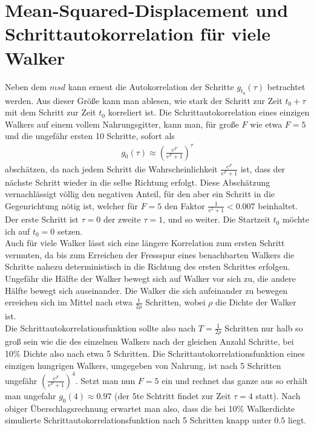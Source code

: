 \documentclass[a4paper, 12pt]{report}
\begin{document}
\section{Mean-Squared-Displacement und Schrittautokorrelation für viele Walker}
Neben dem $msd$ kann erneut die Autokorrelation der Schritte $g_{t_0}(\tau)$ betrachtet werden. Aus dieser Größe kann man ablesen, wie stark der Schritt zur Zeit $t_0 + \tau$ mit dem Schritt zur Zeit $t_0$ korreliert ist.
Die Schrittautokorrelation eines einzigen Walkers auf einem vollem Nahrungsgitter, kann man, für große $F$ wie etwa $F=5$ und die ungefähr ersten 10 Schritte, sofort als 
\begin{align}
g_{0}(\tau) \approx \left(\frac{e^F}{e^F+1}\right)^{\tau}
\end{align}
abschätzen, da nach jedem Schritt die Wahrscheinlichkeit $\frac{e^F}{e^F+1}$ ist, dass der nächste Schritt wieder in die selbe Richtung erfolgt. Diese Abschätzung vernachlässigt völlig den negativen Anteil, für den aber ein Schritt in die Gegenrichtung nötig ist, welcher für $F=5$ den Faktor $\frac{1}{e^5 + 1} < 0.007$ beinhaltet. Der erste Schritt ist $\tau = 0$ der zweite $\tau=1$, und so weiter. Die Startzeit $t_0$ möchte ich auf $t_0=0$ setzen.
\\
\noindent Auch für viele Walker lässt sich eine längere Korrelation zum ersten Schritt vermuten, da bis zum Erreichen der Fressspur eines benachbarten Walkers die Schritte nahezu deterministisch in die Richtung des ersten Schrittes erfolgen.
\\
\noindent Ungefähr die Hälfte der Walker bewegt sich auf Walker vor sich zu, die andere Hälfte bewegt sich auseinander. Die Walker die sich aufeinander zu bewegen erreichen sich im Mittel nach etwa $\frac{1}{2 \rho}$ Schritten, wobei $\rho$ die Dichte der Walker ist.
\\
\noindent Die Schrittautokorrelationsfunktion sollte also nach $T = \frac{1}{2 \rho}$ Schritten nur halb so groß sein wie die des einzelnen Walkers nach der gleichen Anzahl Schritte, bei 10\% Dichte also nach etwa 5 Schritten. Die Schrittautokorrelationsfunktion eines einzigen hungrigen Walkers, umgegeben von Nahrung, ist nach 5 Schritten ungefähr $\left(\frac{e^F}{e^F+1}\right)^{4}$. Setzt man nun $F=5$ ein und rechnet das ganze aus so erhält man ungefahr $g_0(4) \approx 0.97$ (der 5te Schtritt findet zur Zeit $\tau =4$ statt). Nach obiger Überschlagsrechnung erwartet man also, dass die bei 10\% Walkerdichte simulierte Schrittautokorrelationsfunktion nach 5 Schritten knapp unter $0.5$ liegt.
\\
\end{document}
